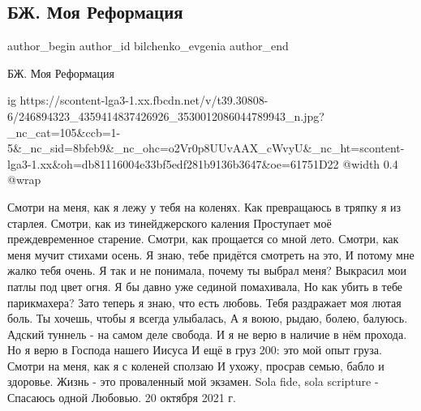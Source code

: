  
 
 
 
 
 
\subsection{БЖ. Моя Реформация}
\label{sec:20_10_2021.fb.bilchenko_evgenia.1.reformacia}
 
\ifcmt
 author_begin
   author_id bilchenko_evgenia
 author_end
\fi

БЖ. Моя Реформация

\ifcmt
  ig https://scontent-lga3-1.xx.fbcdn.net/v/t39.30808-6/246894323_4359414837426926_3530012086044789943_n.jpg?_nc_cat=105&ccb=1-5&_nc_sid=8bfeb9&_nc_ohc=o2Vr0p8UUvAAX_cWvyU&_nc_ht=scontent-lga3-1.xx&oh=db81116004e33bf5edf281b9136b3647&oe=61751D22
  @width 0.4
  @wrap 
\fi

Смотри на меня, как я лежу у тебя на коленях.
Как превращаюсь в тряпку я из старлея.
Смотри, как из тинейджерского каления
Проступает моё преждевременное старение.
Смотри, как прощается со мной лето.
Смотри, как меня мучит стихами осень.
Я знаю, тебе придётся смотреть на это,
И потому мне жалко тебя очень.
Я так и не понимала, почему ты выбрал меня?
Выкрасил мои патлы под цвет огня.
Я бы давно уже сединой помахивала,
Но как убить в тебе парикмахера?
Зато теперь я знаю, что есть любовь.
Тебя раздражает моя лютая боль.
Ты хочешь, чтобы я всегда улыбалась,
А я воюю, рыдаю, болею, балуюсь.
Адский туннель - на самом деле свобода.
И я не верю в наличие в нём прохода.
Но я верю в Господа нашего Иисуса
И ещё в груз 200: это мой опыт груза.
Смотри на меня, как я с коленей сползаю
И ухожу, просрав семью, бабло и здоровье.
Жизнь - это проваленный мой экзамен.
Sola fide, sola scripture - 
Спасаюсь одной Любовью. 
20 октября 2021 г.
